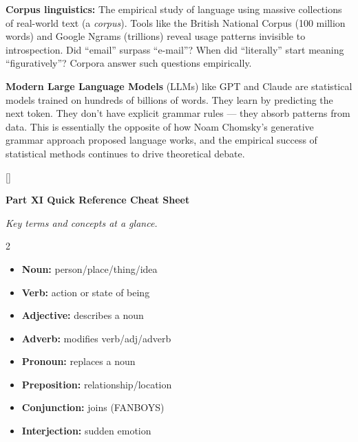 \documentclass[11pt, letterpaper]{article}
\newcommand{\purplesections}{%
  \titleformat{\section}{\large\bfseries\color{sectionpurple}}{}{0em}{}[\color{sectionpurple}\titlerule]%
  \titleformat{\subsection}{\normalsize\bfseries\color{sectionpurple!80!black}}{}{0em}{}%
}
\newcommand{\partbanner}[3]{%
  \begin{tcolorbox}[colback=#1, colframe=#2, boxrule=1.2pt, arc=4pt,
    left=8pt, right=8pt, top=6pt, bottom=6pt]
    \begin{center}{\LARGE\bfseries #3}\end{center}
  \end{tcolorbox}%
}
\begin{document}
\textbf{Corpus linguistics:} The empirical study of language using massive collections of real-world text (a \emph{corpus}). Tools like the British National Corpus (100 million words) and Google Ngrams (trillions) reveal usage patterns invisible to introspection. Did ``email'' surpass ``e-mail''? When did ``literally'' start meaning ``figuratively''? Corpora answer such questions empirically.

\textbf{Modern Large Language Models} (LLMs) like GPT and Claude are statistical models trained on hundreds of billions of words. They learn by predicting the next token. They don't have explicit grammar rules --- they absorb patterns from data. This is essentially the opposite of how Noam Chomsky's generative grammar approach proposed language works, and the empirical success of statistical methods continues to drive theoretical debate.

\newpage

\purplesections
{}
\partbanner{part3bg}{sectionpurple}{Part XI \quad Quick Reference Cheat Sheet}

\vspace{4pt}
\begin{center}\small\itshape
  Key terms and concepts at a glance.
\end{center}
\vspace{4pt}

\begin{tcolorbox}[colback=partbg, colframe=sectionblue,
  title={\bfseries English Parts of Speech (NVAAPPCI)}, arc=3pt, boxrule=1pt]
\footnotesize
\begin{multicols}{2}
\begin{itemize}[noitemsep, leftmargin=*]
  \item \textbf{Noun:} person/place/thing/idea
  \item \textbf{Verb:} action or state of being
  \item \textbf{Adjective:} describes a noun
  \item \textbf{Adverb:} modifies verb/adj/adverb
\end{itemize}
\columnbreak
\begin{itemize}[noitemsep, leftmargin=*]
  \item \textbf{Pronoun:} replaces a noun
  \item \textbf{Preposition:} relationship/location
  \item \textbf{Conjunction:} joins (FANBOYS)
  \item \textbf{Interjection:} sudden emotion
\end{itemize}
\end{multicols}
\end{tcolorbox}
\end{document}
